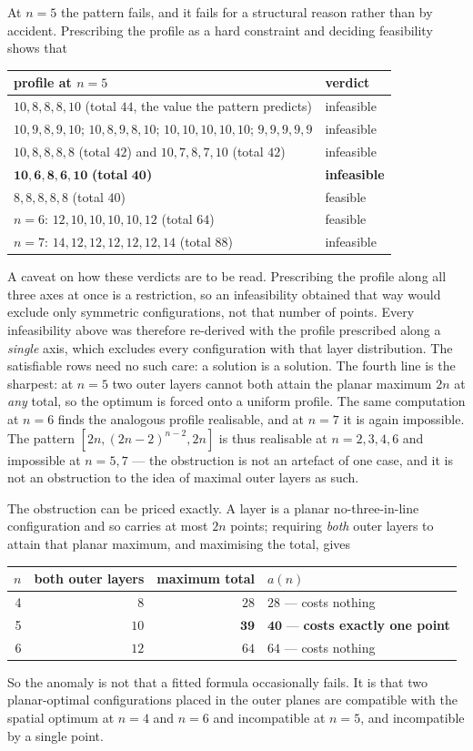 \documentclass[11pt,a4paper]{article}
\begin{document}
At $n=5$ the pattern fails, and it fails for a structural reason rather than by accident.  Prescribing the
profile as a hard constraint and deciding feasibility shows that
\begin{center}\begin{tabular}{ll}\toprule
profile at $n=5$ & verdict\\\midrule
$10,8,8,8,10$ (total $44$, the value the pattern predicts) & infeasible\\
$10,9,8,9,10$; $10,8,9,8,10$; $10,10,10,10,10$; $9,9,9,9,9$ & infeasible\\
$10,8,8,8,8$ (total $42$) and $10,7,8,7,10$ (total $42$) & infeasible\\
$\mathbf{10,6,8,6,10}$ \textbf{(total }$\mathbf{40}$\textbf{)} & \textbf{infeasible}\\
$8,8,8,8,8$ (total $40$) & feasible\\\midrule
$n=6$: $12,10,10,10,10,12$ (total $64$) & feasible\\
$n=7$: $14,12,12,12,12,12,14$ (total $88$) & infeasible\\\bottomrule
\end{tabular}\end{center}
A caveat on how these verdicts are to be read.  Prescribing the profile along all three axes at once is a
restriction, so an infeasibility obtained that way would exclude only symmetric configurations, not that number
of points.  Every infeasibility above was therefore re-derived with the profile prescribed along a
\emph{single} axis, which excludes every configuration with that layer distribution.  The satisfiable rows need
no such care: a solution is a solution.
The fourth line is the sharpest: at $n=5$ two outer layers cannot both attain the planar maximum $2n$ at
\emph{any} total, so the optimum is forced onto a uniform profile.  The same computation at $n=6$ finds the
analogous profile realisable, and at $n=7$ it is again impossible.  The pattern $[2n,(2n-2)^{n-2},2n]$ is thus
realisable at $n=2,3,4,6$ and impossible at $n=5,7$ --- the obstruction is not an artefact of one case, and it
is not an obstruction to the idea of maximal outer layers as such.

The obstruction can be priced exactly.  A layer is a planar no-three-in-line configuration and so carries at
most $2n$ points; requiring \emph{both} outer layers to attain that planar maximum, and maximising the total,
gives
\begin{center}\begin{tabular}{rrrl}\toprule
$n$ & both outer layers & maximum total & $a(n)$\\\midrule
4 & $8$ & $28$ & $28$ --- costs nothing\\
5 & $10$ & $\mathbf{39}$ & $\mathbf{40}$ --- \textbf{costs exactly one point}\\
6 & $12$ & $64$ & $64$ --- costs nothing\\\bottomrule
\end{tabular}\end{center}
So the anomaly is not that a fitted formula occasionally fails.  It is that two planar-optimal configurations
placed in the outer planes are compatible with the spatial optimum at $n=4$ and $n=6$ and incompatible at
$n=5$, and incompatible by a single point.
\end{document}
